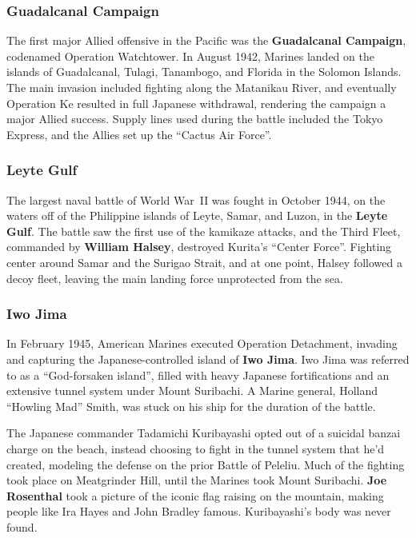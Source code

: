 \subsubsection*{Guadalcanal Campaign}

The first major Allied offensive in the Pacific was the \textbf{Guadalcanal Campaign},
codenamed Operation Watchtower.
In August 1942, Marines landed on the islands of Guadalcanal, Tulagi, Tanambogo, and Florida in the Solomon Islands.
The main invasion included fighting along the Matanikau River,
and eventually Operation Ke resulted in full Japanese withdrawal, rendering the campaign a major Allied success.
Supply lines used during the battle included the Tokyo Express, and the Allies set up the ``Cactus Air Force''.

\subsubsection*{Leyte Gulf}

The largest naval battle of World War~II was fought in October 1944,
on the waters off of the Philippine islands of Leyte, Samar, and Luzon,
in the \textbf{Leyte Gulf}.
The battle saw the first use of the kamikaze attacks,
and the Third Fleet, commanded by \textbf{William Halsey}, destroyed Kurita's ``Center Force''.
Fighting center around Samar and the Surigao Strait,
and at one point, Halsey followed a decoy fleet, leaving the main landing force unprotected from the sea.

\subsubsection*{Iwo Jima}

In February 1945, American Marines executed Operation Detachment,
invading and capturing the Japanese-controlled island of \textbf{Iwo Jima}.
Iwo Jima was referred to as a ``God-forsaken island'',
filled with heavy Japanese fortifications and an extensive tunnel system under Mount Suribachi.
A Marine general, Holland ``Howling Mad'' Smith, was stuck on his ship for the duration of the battle.

The Japanese commander Tadamichi Kuribayashi opted out of a suicidal banzai charge on the beach,
instead choosing to fight in the tunnel system that he'd created,
modeling the defense on the prior Battle of Peleliu.
Much of the fighting took place on Meatgrinder Hill,
until the Marines took Mount Suribachi.
\textbf{Joe Rosenthal} took a picture of the iconic flag raising on the mountain,
making people like Ira Hayes and John Bradley famous.
Kuribayashi's body was never found.

